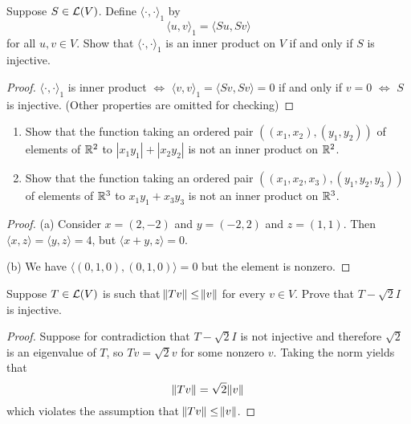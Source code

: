 \documentclass{extarticle}
\begin{document}
\begin{problem}{2}
    Suppose \(S \in \mathcal{L}(V)\). Define \(\langle \cdot, \cdot \rangle_1\) by 
    \[\langle u,v \rangle_1 = \langle Su,Sv \rangle\]
    for all \(u, v \in V\). Show that \(\langle \cdot,\cdot \rangle_1\) is an inner product on 
    \(V\) if and only if \(S\) is injective.
\end{problem}

\begin{proof}
    \(\langle \cdot,\cdot \rangle_1\) is inner product \(\Longleftrightarrow\) 
    \(\langle v,v \rangle_1 = \langle Sv,Sv \rangle = 0\) if and only if \(v = 0\) \(\Longleftrightarrow\) 
    \(S\) is injective. (Other properties are omitted for checking)
\end{proof}

\begin{problem}{3}
    \begin{enumerate}[label=(\alph*)]
        \item Show that the function taking an ordered pair \(((x_1, x_2), (y_1, y_2))\) of elements of 
        \(\mathbb{R}^2\) to \(|x_1 y_1| + |x_2 y_2|\) is not an inner product on \(\mathbb{R}^2\).
        \item Show that the function taking an ordered pair \(((x_1, x_2, x_3), (y_1, y_2, y_3))\) of 
        elements of \(\mathbb{R}^3\) to \(x_1y_1 + x_3y_3\) is not an inner product on \(\mathbb{R}^3\).
    \end{enumerate}
\end{problem}

\begin{proof}
(a) Consider \(x = (2, -2)\) and \(y = (-2, 2)\) and \(z = (1, 1)\). Then \(\langle x,z \rangle 
= \langle y,z \rangle = 4\), but \(\langle x + y,z \rangle = 0\).

(b) We have \(\langle (0, 1, 0),(0, 1, 0) \rangle = 0\) but the element is nonzero.
\end{proof}

\begin{problem}{4}
    Suppose \(T \in \mathcal{L}(V)\) is such that \(\norm{Tv} \leq \norm{v}\) for every \(v \in V\). Prove that 
    \(T - \sqrt{2}I\) is injective.
\end{problem}

\begin{proof}
Suppose for contradiction that \( T - \sqrt{2} I \) is not injective and therefore \(\sqrt{2}\) is an eigenvalue 
of \(T\), so \(Tv = \sqrt{2}v\) for some nonzero \(v\). Taking the norm yields that  
\[\norm{Tv} = \sqrt{2} \norm{v}\]
which violates the assumption that \(\norm{Tv} \leq \norm{v}\).
\end{proof}
\end{document}
